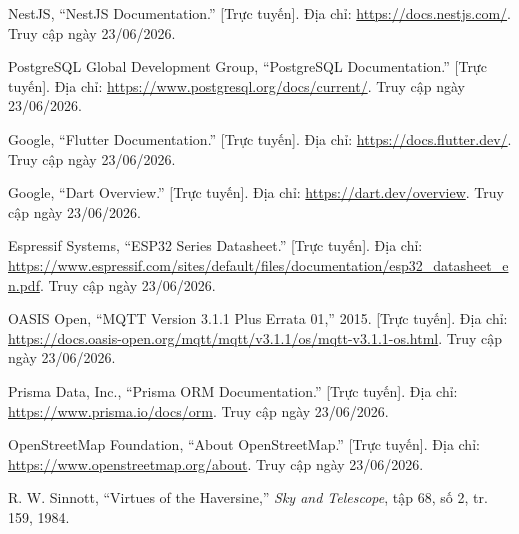 \documentclass[../DoAn.tex]{subfiles}
\begin{document}
\begin{enumerate}[label={[{\arabic*}]},leftmargin=1.2cm,labelsep=0.3cm]

  

    \item NestJS, ``NestJS Documentation.'' [Trực tuyến]. Địa chỉ:
    \url{https://docs.nestjs.com/}. Truy cập ngày 23/06/2026.

    \item PostgreSQL Global Development Group, ``PostgreSQL
    Documentation.'' [Trực tuyến]. Địa chỉ:
    \url{https://www.postgresql.org/docs/current/}. Truy cập ngày
    23/06/2026.

    \item Google, ``Flutter Documentation.'' [Trực tuyến]. Địa chỉ:
    \url{https://docs.flutter.dev/}. Truy cập ngày 23/06/2026.

    \item Google, ``Dart Overview.'' [Trực tuyến]. Địa chỉ:
    \url{https://dart.dev/overview}. Truy cập ngày 23/06/2026.

    \item Espressif Systems, ``ESP32 Series Datasheet.'' [Trực tuyến].
    Địa chỉ:
    \url{https://www.espressif.com/sites/default/files/documentation/esp32_datasheet_en.pdf}.
    Truy cập ngày 23/06/2026.

    \item OASIS Open, ``MQTT Version 3.1.1 Plus Errata 01,'' 2015.
    [Trực tuyến]. Địa chỉ:
    \url{https://docs.oasis-open.org/mqtt/mqtt/v3.1.1/os/mqtt-v3.1.1-os.html}.
    Truy cập ngày 23/06/2026.

    \item Prisma Data, Inc., ``Prisma ORM Documentation.'' [Trực tuyến].
    Địa chỉ: \url{https://www.prisma.io/docs/orm}. Truy cập ngày
    23/06/2026.

    \item OpenStreetMap Foundation, ``About OpenStreetMap.'' [Trực tuyến].
    Địa chỉ: \url{https://www.openstreetmap.org/about}. Truy cập ngày
    23/06/2026.

    \item R. W. Sinnott, ``Virtues of the Haversine,'' \textit{Sky and
    Telescope}, tập 68, số 2, tr. 159, 1984.


\end{enumerate}
\end{document}
